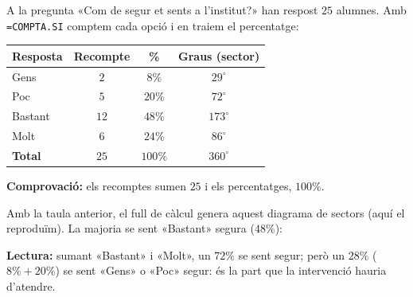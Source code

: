\begin{exemple}
A la pregunta «Com de segur et sents a l'institut?» han respost $25$ alumnes. Amb
\texttt{=COMPTA.SI} comptem cada opció i en traiem el percentatge:

\begin{center}
\begin{tabular}{l c c c}
\toprule
\textbf{Resposta} & \textbf{Recompte} & \textbf{\%} & \textbf{Graus (sector)} \\
\midrule
Gens & $2$ & $8\%$ & $29^\circ$ \\
Poc & $5$ & $20\%$ & $72^\circ$ \\
Bastant & $12$ & $48\%$ & $173^\circ$ \\
Molt & $6$ & $24\%$ & $86^\circ$ \\
\midrule
\textbf{Total} & $25$ & $100\%$ & $360^\circ$ \\
\bottomrule
\end{tabular}
\end{center}

\textbf{Comprovació:} els recomptes sumen $25$ i els percentatges, $100\%$.
\end{exemple}

\begin{exemple}
Amb la taula anterior, el full de càlcul genera aquest diagrama de sectors (aquí el
reproduïm). La majoria se sent «Bastant» segura ($48\%$):

\begin{center}

\end{center}

\noindent\textbf{Lectura:} sumant «Bastant» i «Molt», un $72\%$ se sent segur; però un
$28\%$ ($8\%+20\%$) se sent «Gens» o «Poc» segur: és la part que la intervenció hauria
d'atendre.
\end{exemple}

